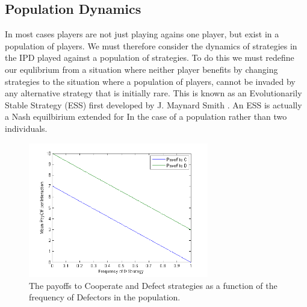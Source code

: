 \documentclass[11pt]{article} %
\begin{document}
\subsection{Population Dynamics}
In most cases players are not just playing agains one player, but exist in a population of players. We must therefore consider the dynamics of strategies in the IPD played against a population of strategies. To do this we must redefine our equlibrium from a situation where neither player benefits by changing strategies to the situation where a population of players, cannot be invaded by any alternative strategy that is initially rare. This is known as an Evolutionarily Stable Strategy (ESS) first developed by J. Maynard Smith \cite{smithprice1973}. An ESS is actually a Nash equilbirium extended for In the case of a population rather than two individuals. 

\begin{figure}[ht]
	\includegraphics[width=0.7\textwidth]{c_vs_d.png}
	\caption{The payoffs to Cooperate and Defect strategies as a function of the frequency of Defectors in the population.}
	\label{cvsd}
\end{figure}
\end{document}
